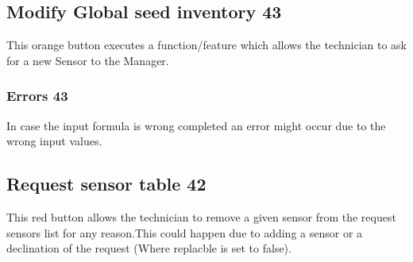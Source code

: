 \subsection{Modify Global seed inventory 43}
This orange button executes a function/feature which allows the technician to
ask for a new Sensor to the Manager.
\subsubsection{Errors 43}
In case the input formula is wrong completed an error might occur due to the
wrong input values.


\subsection{Request sensor table 42}
This red button allows the technician to remove a given sensor from the request
sensors list for any reason.This could happen due to adding a sensor or a
declination of the request (Where replacble is set to false).


























